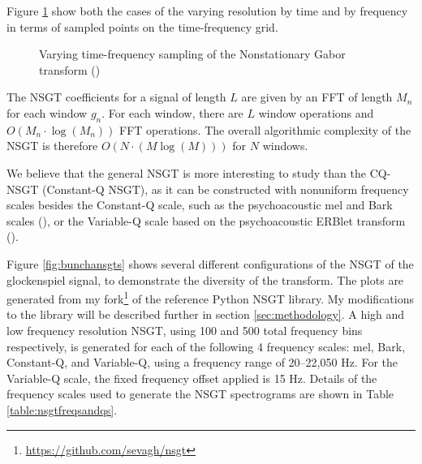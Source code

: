 \documentclass[report.tex]{subfiles}
\begin{document}
Figure \ref{fig:nonuniformtflattices} show both the cases of the varying resolution by time and by frequency in terms of sampled points on the time-frequency grid.

\begin{figure}[ht]
	\centering
	\hspace{1em}
	\caption{Varying time-frequency sampling of the Nonstationary Gabor transform (\cite[1485, 1487]{balazs})}
	\label{fig:nonuniformtflattices}
\end{figure}

The NSGT coefficients for a signal of length $L$ are given by an FFT of length $M_{n}$ for each window $g_{n}$. For each window, there are $L$ window operations and $O(M_{n} \cdot \log(M_{n}))$ FFT operations. The overall algorithmic complexity of the NSGT is therefore $O(N \cdot (M \log(M)))$ for $N$ windows.

We believe that the general NSGT is more interesting to study than the CQ-NSGT (Constant-Q NSGT), as it can be constructed with nonuniform frequency scales besides the Constant-Q scale, such as the psychoacoustic mel and Bark scales (\cite{melbook}), or the Variable-Q scale based on the psychoacoustic ERBlet transform (\cite{variableq1, variableq2}).

Figure \ref{fig:bunchansgts} shows several different configurations of the NSGT of the glockenspiel signal, to demonstrate the diversity of the transform. The plots are generated from my fork\footnote{\url{https://github.com/sevagh/nsgt}} of the reference Python NSGT library. My modifications to the library will be described further in section \ref{sec:methodology}. A high and low frequency resolution NSGT, using 100 and 500 total frequency bins respectively, is generated for each of the following 4 frequency scales: mel, Bark, Constant-Q, and Variable-Q, using a frequency range of 20--22,050 Hz. For the Variable-Q scale, the fixed frequency offset applied is 15 Hz.  Details of the frequency scales used to generate the NSGT spectrograms are shown in Table \ref{table:nsgtfreqsandqs}.
\end{document}
